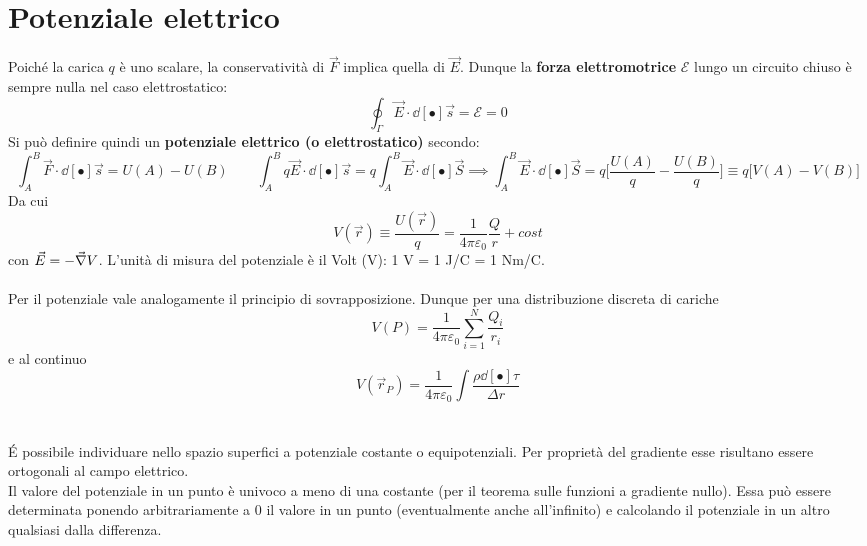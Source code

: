 \section{Potenziale elettrico}
Poiché la carica $q$ è uno scalare, la conservatività di $\vec{F}$ implica quella di $\vec{E}$. Dunque la \textbf{forza elettromotrice} $\mathcal{E}$ lungo un circuito chiuso è sempre nulla nel caso elettrostatico:
\[\oint_\Gamma \vec{E} \cdot \dd[•]{\vec{s}} = \mathcal{E} = 0\]
Si può definire quindi un \textbf{potenziale elettrico (o elettrostatico)} secondo:
\[\int_A^B \vec{F} \cdot \dd[•]{\vec{s}} = U(A) - U(B) \qquad \int_A^B q \vec{E} \cdot \dd[•]{\vec{s}} = q \int_A^B \vec{E} \cdot \dd[•]{\vec{S}} \implies \int_A^B \vec{E} \cdot \dd[•]{\vec{S}} = q \big[\frac{U(A)}{q} - \frac{U(B)}{q}\big] \equiv q \big[V(A) - V(B)\big]\]
Da cui
\[V(\vec{r}) \equiv \frac{U(\vec{r})}{q} = \frac{1}{4 \pi \varepsilon_0} \frac{Q}{r} + cost\]
con $\displaystyle \vec{E} = - \vec{\nabla} V$. L'unità di misura del potenziale è il Volt (V): 1 V = 1 J/C = 1 Nm/C.
\\~\\
Per il potenziale vale analogamente il principio di sovrapposizione. Dunque per una distribuzione discreta di cariche
\[V(P) = \frac{1}{4 \pi \varepsilon_0} \sum\limits_{i=1}^{N} \frac{Q_i}{r_i}\]
e al continuo
\[V(\vec{r}_P) = \frac{1}{4 \pi \varepsilon_0} \int \frac{\rho \dd[•]{\tau}}{\Delta r}\]
\\~\\
\'E possibile individuare nello spazio superfici a potenziale costante o equipotenziali. Per proprietà del gradiente esse risultano essere ortogonali al campo elettrico.
\\Il valore del potenziale in un punto è univoco a meno di una costante (per il teorema sulle funzioni a gradiente nullo). Essa può essere determinata ponendo arbitrariamente a $0$ il valore in un punto (eventualmente anche all'infinito) e calcolando il potenziale in un altro qualsiasi dalla differenza.

